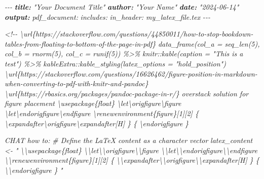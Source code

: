 \documentclass[
]{article}
\newenvironment{Shaded}{\begin{snugshade}}{\end{snugshade}}
\newcommand{\AnnotationTok}[1]{\textcolor[rgb]{0.56,0.35,0.01}{\textbf{\textit{#1}}}}
\newcommand{\CommentTok}[1]{\textcolor[rgb]{0.56,0.35,0.01}{\textit{#1}}}
\begin{document}
\begin{Shaded}
\begin{Highlighting}[]
\CommentTok{{-}{-}{-}}
\AnnotationTok{title:}\CommentTok{ "Your Document Title"}
\AnnotationTok{author:}\CommentTok{ "Your Name"}
\AnnotationTok{date:}\CommentTok{ "2024{-}06{-}14"}
\AnnotationTok{output:}
\CommentTok{  pdf\_document:}
\CommentTok{    includes:}
\CommentTok{      in\_header: my\_latex\_file.tex}
\CommentTok{{-}{-}{-}}


\CommentTok{\textless{}!{-}{-}}
\CommentTok{\textbackslash{}url\{https://stackoverflow.com/questions/44850011/how{-}to{-}stop{-}bookdown{-}tables{-}from{-}floating{-}to{-}bottom{-}of{-}the{-}page{-}in{-}pdf\}}
\CommentTok{data\_frame(col\_a = seq\_len(5), col\_b = rnorm(5), col\_c = runif(5)) \%\textgreater{}\%}
\CommentTok{  knitr::kable(caption = "This is a test") \%\textgreater{}\%}
\CommentTok{  kableExtra::kable\_styling(latex\_options = "hold\_position")}
\CommentTok{  }
\CommentTok{  }
\CommentTok{\textbackslash{}url\{https://stackoverflow.com/questions/16626462/figure{-}position{-}in{-}markdown{-}when{-}converting{-}to{-}pdf{-}with{-}knitr{-}and{-}pandoc\}}
\CommentTok{\textbackslash{}url\{https://rbasics.org/packages/pandoc{-}package{-}in{-}r/\}}
\CommentTok{overstack solution for figure placement}
\CommentTok{\textbackslash{}usepackage\{float\}}
\CommentTok{\textbackslash{}let\textbackslash{}origfigure\textbackslash{}figure}
\CommentTok{\textbackslash{}let\textbackslash{}endorigfigure\textbackslash{}endfigure}
\CommentTok{\textbackslash{}renewenvironment\{figure\}[1][2] \{}
\CommentTok{    \textbackslash{}expandafter\textbackslash{}origfigure\textbackslash{}expandafter[H]}
\CommentTok{\} \{}
\CommentTok{    \textbackslash{}endorigfigure}
\CommentTok{\}}


\CommentTok{CHAT how to:}
\CommentTok{\# Define the LaTeX content as a character vector}
\CommentTok{latex\_content \textless{}{-} "}
\CommentTok{\textbackslash{}\textbackslash{}usepackage\{float\}}
\CommentTok{\textbackslash{}\textbackslash{}let\textbackslash{}\textbackslash{}origfigure\textbackslash{}\textbackslash{}figure}
\CommentTok{\textbackslash{}\textbackslash{}let\textbackslash{}\textbackslash{}endorigfigure\textbackslash{}\textbackslash{}endfigure}
\CommentTok{\textbackslash{}\textbackslash{}renewenvironment\{figure\}[1][2] \{}
\CommentTok{    \textbackslash{}\textbackslash{}expandafter\textbackslash{}\textbackslash{}origfigure\textbackslash{}\textbackslash{}expandafter[H]}
\CommentTok{\} \{}
\CommentTok{    \textbackslash{}\textbackslash{}endorigfigure}
\CommentTok{\}}
\CommentTok{"}


\end{Highlighting}
\end{Shaded}
\end{document}

